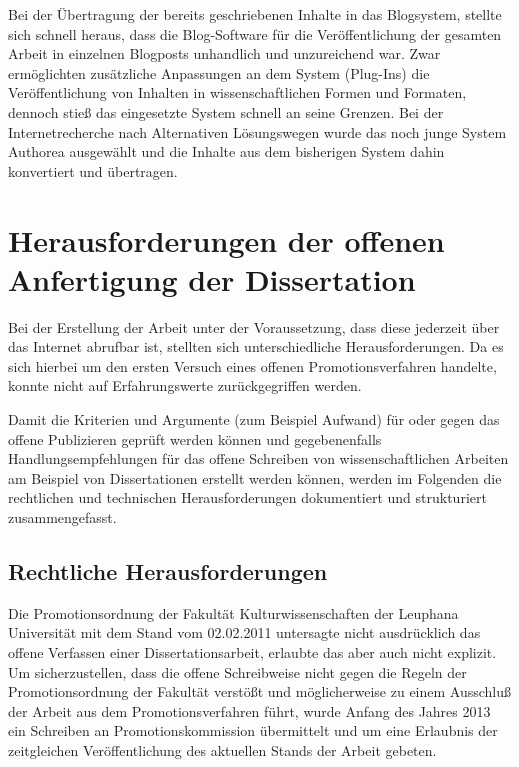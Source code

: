 Bei der Übertragung der bereits geschriebenen Inhalte in das Blogsystem, stellte sich schnell heraus, dass die Blog-Software für die Veröffentlichung der gesamten Arbeit in einzelnen Blogposts unhandlich und unzureichend war. Zwar ermöglichten zusätzliche Anpassungen an dem System (Plug-Ins) die Veröffentlichung von Inhalten in wissenschaftlichen Formen und Formaten, dennoch stieß das eingesetzte System schnell an seine Grenzen. Bei der Internetrecherche nach Alternativen Lösungswegen wurde das noch junge System Authorea ausgewählt und die Inhalte aus dem bisherigen System dahin konvertiert und übertragen.

\section{Herausforderungen der offenen Anfertigung der Dissertation}

Bei der Erstellung der Arbeit unter der Voraussetzung, dass diese jederzeit über das Internet abrufbar ist, stellten sich unterschiedliche Herausforderungen. Da es sich hierbei um den ersten Versuch eines offenen Promotionsverfahren handelte, konnte nicht auf Erfahrungswerte zurückgegriffen werden.

Damit die Kriterien und Argumente (zum Beispiel Aufwand) für oder gegen das offene Publizieren geprüft werden können und gegebenenfalls Handlungsempfehlungen für das offene Schreiben von wissenschaftlichen Arbeiten am Beispiel von Dissertationen erstellt werden können, werden im Folgenden die rechtlichen und technischen Herausforderungen dokumentiert und strukturiert zusammengefasst.

\subsection{Rechtliche Herausforderungen}

Die Promotionsordnung der Fakultät Kulturwissenschaften der Leuphana Universität mit dem Stand vom 02.02.2011 \cite{promotionsordnung_leuphana_kuwi_2011} untersagte nicht ausdrücklich das offene Verfassen einer Dissertationsarbeit, erlaubte das aber auch nicht explizit. Um sicherzustellen, dass die offene Schreibweise nicht gegen die Regeln der Promotionsordnung der Fakultät verstößt und möglicherweise zu einem Ausschluß der Arbeit aus dem Promotionsverfahren führt, wurde Anfang des Jahres 2013 ein Schreiben an Promotionskommission übermittelt und um eine Erlaubnis der zeitgleichen Veröffentlichung des aktuellen Stands der Arbeit gebeten.

